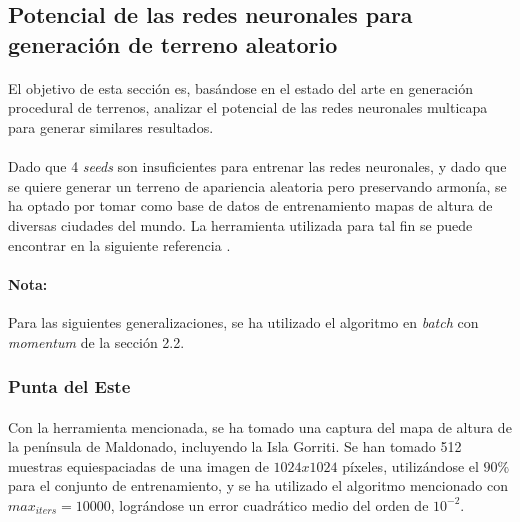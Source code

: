 \documentclass[12pt, twocolumn]{article}
\begin{document}
	\subsection[Redes neuronales y terreno aleatorio]{Potencial de las redes neuronales para generación de terreno aleatorio}
	
	\paragraph{} El objetivo de esta sección es, basándose en el estado del arte en generación procedural de terrenos, analizar el potencial de las redes neuronales multicapa para generar similares resultados. 
	
	\paragraph{} Dado que 4 \textit{seeds} son insuficientes para entrenar las redes neuronales, y dado que se quiere generar un terreno de apariencia aleatoria pero preservando armonía, se ha optado por tomar como base de datos de entrenamiento mapas de altura de diversas ciudades del mundo. La herramienta utilizada para tal fin se puede encontrar en la siguiente referencia \cite{terrainparty}.
	
	\paragraph{Nota:} Para las siguientes generalizaciones, se ha utilizado el algoritmo en \textit{batch} con \textit{momentum} de la sección 2.2.
	
	\subsubsection{Punta del Este}
	
	\paragraph{} Con la herramienta mencionada, se ha tomado una captura del mapa de altura de la península de Maldonado, incluyendo la Isla Gorriti. Se han tomado 512 muestras equiespaciadas de una imagen de $1024x1024$ píxeles, utilizándose el $90\%$ para el conjunto de entrenamiento, y se ha utilizado el algoritmo mencionado con $max_{iters} = 10000$, lográndose un error cuadrático medio del orden de $10^{-2}$.
	
\end{document}
